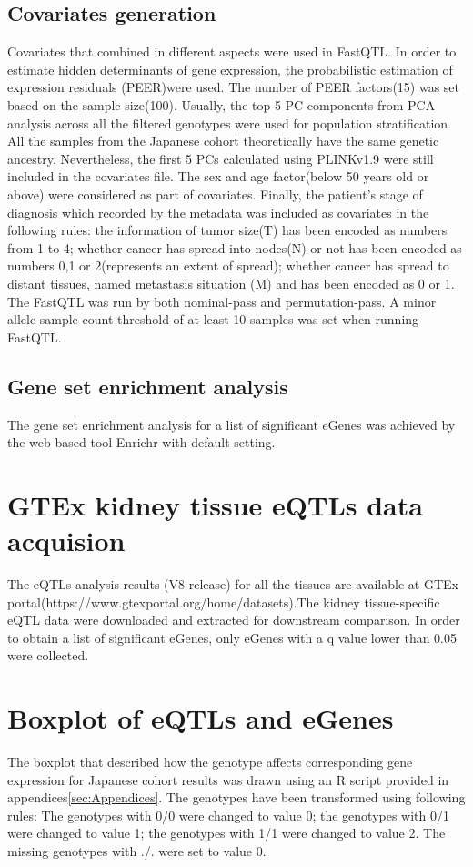 \subsection{Covariates generation}
Covariates that combined in different aspects were used in FastQTL. In order to estimate hidden determinants of gene expression, the probabilistic estimation of expression residuals (PEER)\cite{stegle_using_2012}were used. The number of PEER factors(15) was set based on the sample size(100). Usually, the top 5 PC components from PCA analysis across all the filtered genotypes were used for population stratification. All the samples from the Japanese cohort theoretically have the same genetic ancestry. Nevertheless, the first 5 PCs calculated using PLINKv1.9\cite{purcell_plink_2007} were still included in the covariates file. The sex and age factor(below 50 years old or above) were considered as part of covariates. Finally, the patient's stage of diagnosis which recorded by the metadata was included as covariates in the following rules:  the information of tumor size(T) has been encoded as numbers from 1 to 4; whether cancer has spread into nodes(N) or not has been encoded as numbers 0,1 or 2(represents an extent of spread);  whether cancer has spread to distant tissues, named metastasis situation (M)  and has been encoded as 0 or 1. The FastQTL was run by both nominal-pass and permutation-pass. A minor allele sample count threshold of at least 10 samples was set when running FastQTL.

\subsection{Gene set enrichment analysis}

The gene set enrichment analysis for a list of significant eGenes was achieved by the web-based tool Enrichr\cite{kuleshov_enrichr_2016} with default setting. 

\section{GTEx kidney tissue eQTLs data acquision}

The eQTLs analysis results (V8 release) for all the tissues are available at GTEx portal(https://www.gtexportal.org/home/datasets).The kidney tissue-specific eQTL data were downloaded and extracted for downstream comparison. In order to obtain a list of significant eGenes, only eGenes with a q value lower than 0.05 were collected.

\section{Boxplot of eQTLs and eGenes}

The boxplot that described how the genotype affects corresponding gene expression for Japanese cohort results was drawn using an R script provided in appendices\ref{sec:Appendices}. The genotypes have been transformed using following rules: The genotypes with 0/0 were changed to value 0; the genotypes with 0/1 were changed to value 1; the genotypes with 1/1 were changed  to value 2. The missing genotypes with ./. were set to value 0. 

